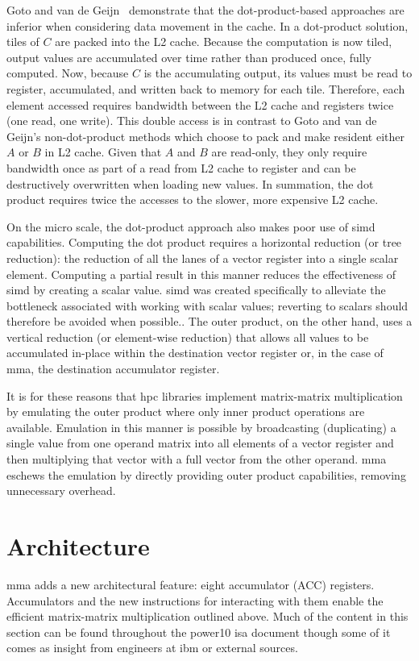 \documentclass[\main/thesis.tex]{subfiles}
\begin{document}
Goto and van de Geijn~\autocite{goto2008anatomy} demonstrate that the dot-product-based approaches are inferior when considering data movement in the cache.
In a dot-product solution, tiles of $C$ are packed into the L2 cache.
Because the computation is now tiled, output values are accumulated over time rather than produced once, fully computed.
Now, because $C$ is the accumulating output, its values must be read to register, accumulated, and written back to memory for each tile.
Therefore, each element accessed requires bandwidth between the L2 cache and registers twice (one read, one write).
This double access is in contrast to Goto and van de Geijn's non-dot-product methods which choose to pack and make resident either $A$ or $B$ in L2 cache.
Given that $A$ and $B$ are read-only, they only require bandwidth once as part of a read from L2 cache to register and can be destructively overwritten when loading new values.
In summation, the dot product requires twice the accesses to the slower, more expensive L2 cache.

On the micro scale, the dot-product approach also makes poor use of \gls{simd} capabilities.
Computing the dot product requires a horizontal reduction (or tree reduction): the reduction of all the lanes of a vector register into a single scalar element.
Computing a partial result in this manner reduces the effectiveness of \gls{simd} by creating a scalar value.
\Gls{simd} was created specifically to alleviate the bottleneck associated with working with scalar values; reverting to scalars should therefore be avoided when possible..
The outer product, on the other hand, uses a vertical reduction (or element-wise reduction) that allows all values to be accumulated in-place within the destination vector register or, in the case of \gls{mma}, the destination accumulator register.

It is for these reasons that \gls{hpc} libraries implement matrix-matrix multiplication by emulating the outer product where only inner product operations are available.
Emulation in this manner is possible by broadcasting (duplicating) a single value from one operand matrix into all elements of a vector register and then multiplying that vector with a full vector from the other operand.
\Gls{mma} eschews the emulation by directly providing outer product capabilities, removing unnecessary overhead.

\section{Architecture}
\gls{mma} adds a new architectural feature: eight accumulator (ACC) registers.
Accumulators and the new instructions for interacting with them enable the efficient matrix-matrix multiplication outlined above.
Much of the content in this section can be found throughout the \gls{power10} \gls{isa} document though some of it comes as insight from engineers at \gls{ibm} or external sources.
\end{document}
